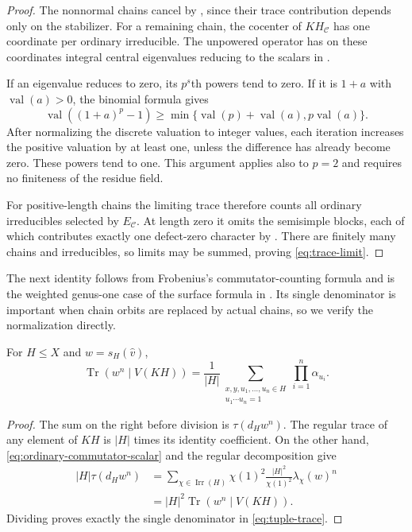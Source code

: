 \begin{proof}
The nonnormal chains cancel by
, since their trace contribution
depends only on the stabilizer. For a remaining chain, the
cocenter of $KH_{\mathcal C}$ has one coordinate per ordinary
irreducible. The unpowered operator has on these coordinates
integral central eigenvalues reducing to the scalars in
.

If an eigenvalue reduces to zero, its $p^s$th powers tend to zero.
If it is $1+a$ with $\operatorname{val}(a)>0$, the binomial
formula gives
\[
 \operatorname{val}((1+a)^p-1)
 \geq
 \min\{\operatorname{val}(p)+\operatorname{val}(a),
                    p\operatorname{val}(a)\}.
\]
After normalizing the discrete valuation to integer values, each
iteration increases the positive valuation by at least one, unless
the difference has already become zero. These powers tend to one.
This argument applies also to $p=2$ and requires no finiteness of
the residue field.

For positive-length chains the limiting trace therefore counts
all ordinary irreducibles selected by $E_{\mathcal C}$. At length
zero it omits the semisimple blocks, each of which contributes
exactly one defect-zero character by
. There are finitely many chains
and irreducibles, so limits may be summed, proving
\eqref{eq:trace-limit}.
\end{proof}

The next identity follows from Frobenius's commutator-counting formula
and is the weighted genus-one case of the surface formula in
\cite[Theorem~2.1 and Equation~(3.1)]{Klug2025}. Its single
denominator is important when chain orbits are replaced by actual
chains, so we verify the normalization directly.

\begin{lemma}\label{lem:tuple-trace}
For $H\leq X$ and $w=s_H(\widehat v)$,
\begin{equation}\label{eq:tuple-trace}
 \operatorname{Tr}(w^n\mid V(KH))
 =\frac1{|H|}
   \sum_{\substack{x,y,u_1,\ldots,u_n\in H\\
                   [x,y]u_1\cdots u_n=1}}
       \prod_{i=1}^n\alpha_{u_i}.
\end{equation}
\end{lemma}

\begin{proof}
The sum on the right before division is
$\tau(d_Hw^n)$. The regular trace of any element of $KH$ is
$|H|$ times its identity coefficient. On the other hand,
\eqref{eq:ordinary-commutator-scalar} and the regular decomposition
give
\begin{align*}
 |H|\tau(d_Hw^n)
  &=\sum_{\chi\in\operatorname{Irr}(H)}
       \chi(1)^2\frac{|H|^2}{\chi(1)^2}\lambda_\chi(w)^n\\
  &=|H|^2\operatorname{Tr}(w^n\mid V(KH)).
\end{align*}
Dividing proves exactly the single denominator in
\eqref{eq:tuple-trace}.
\end{proof}

